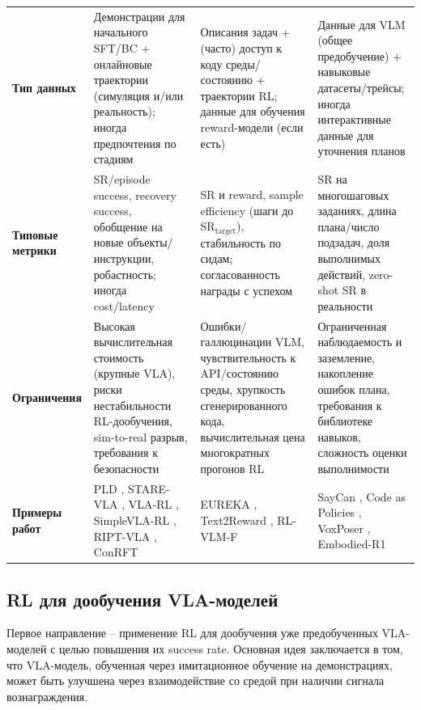 \begin{longtable}{>{\raggedright\arraybackslash}p{} >{\raggedright\arraybackslash}p{} >{\raggedright\arraybackslash}p{} >{\raggedright\arraybackslash}p{}}
\textbf{Тип данных} &
Демонстрации для начального SFT/BC + онлайновые траектории (симуляция и/или реальность); иногда предпочтения по стадиям &
Описания задач + (часто) доступ к коду среды/состоянию + траектории RL; данные для обучения reward-модели (если есть) &
Данные для VLM (общее предобучение) + навыковые датасеты/трейсы; иногда интерактивные данные для уточнения планов \\
\textbf{Типовые метрики} &
SR/episode success, recovery success, обобщение на новые объекты/инструкции, робастность; иногда cost/latency &
SR и reward, sample efficiency (шаги до SR$_\text{target}$), стабильность по сидам; согласованность награды с успехом &
SR на многошаговых заданиях, длина плана/число подзадач, доля выполнимых действий, zero-shot SR в реальности \\
\textbf{Ограничения} &
Высокая вычислительная стоимость (крупные VLA), риски нестабильности RL-дообучения, sim-to-real разрыв, требования к безопасности &
Ошибки/галлюцинации VLM, чувствительность к API/состоянию среды, хрупкость сгенерированного кода, вычислительная цена многократных прогонов RL &
Ограниченная наблюдаемость и заземление, накопление ошибок плана, требования к библиотеке навыков, сложность оценки выполнимости \\
\textbf{Примеры работ} &
PLD \cite{pld2026}, STARE-VLA \cite{starevla2025}, VLA-RL \cite{vlarl2025}, SimpleVLA-RL \cite{simplevlarl2025}, RIPT-VLA \cite{riptvla2025}, ConRFT \cite{conrft2025} &
EUREKA \cite{ma2024eureka}, Text2Reward \cite{xie2024text2reward}, RL-VLM-F \cite{wang2024rlvlmf} &
SayCan \cite{ahn2022saycan}, Code as Policies \cite{liang2023code}, VoxPoser \cite{huang2023voxposer}, Embodied-R1 \cite{embodiedr1_2026} \\
\end{longtable}
\endgroup

\subsection{RL для дообучения VLA-моделей}
\label{subsec:rl-finetune}

    Первое направление -- применение RL для дообучения уже предобученных VLA-моделей с целью повышения их success rate. Основная идея заключается в том, что VLA-модель, обученная через имитационное обучение на демонстрациях, может быть улучшена через взаимодействие со средой при наличии сигнала вознаграждения.

